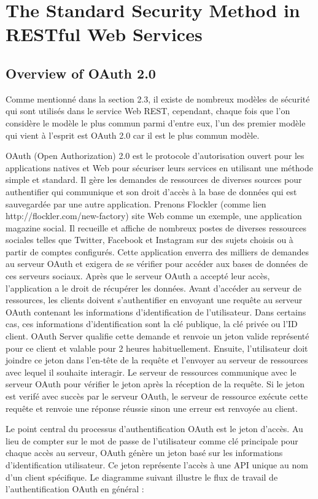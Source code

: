 \chapter{ The Standard Security Method in RESTful Web Services}
\section{Overview of OAuth 2.0}
Comme mentionné dans la section 2.3, il existe de nombreux modèles de sécurité qui sont utilisés dans le service Web REST, cependant, chaque fois que l'on considère le modèle le plus commun parmi d'entre eux, l'un des premier modèle qui vient à l'esprit est OAuth 2.0 car il est le plus commun modèle.

OAuth (Open Authorization) 2.0 est le protocole d'autorisation ouvert pour les applications natives et Web pour sécuriser leurs services en utilisant une méthode simple et standard. Il gère les demandes de ressources de diverses sources pour authentifier qui communique et son droit d'accès à la base de données qui est sauvegardée par une autre application. Prenons Flockler (comme lien http://flockler.com/new-factory) site Web comme un exemple, une application magazine social. Il recueille et affiche de nombreux postes de diverses ressources sociales telles que Twitter, Facebook et Instagram sur des sujets choisis ou à partir de comptes configurés. Cette application enverra des milliers de demandes au serveur OAuth et exigera de se vérifier pour accéder aux bases de données de ces serveurs sociaux. Après que le serveur OAuth a accepté leur accès, l'application a le droit de récupérer les données.
Avant d'accéder au serveur de ressources, les clients doivent s'authentifier  en envoyant une requête au serveur OAuth contenant les informations d'identification de l'utilisateur. Dans certains cas, ces informations d'identification sont la clé publique, la clé privée ou l'ID client. OAuth Server qualifie cette demande et renvoie un jeton valide représenté pour ce client et valable pour 2 heures habituellement. Ensuite, l'utilisateur doit joindre ce jeton dans l'en-tête de la requête et l'envoyer au serveur de ressources avec lequel il souhaite interagir. Le serveur de ressources communique avec le serveur OAuth pour vérifier le jeton après la réception de la requête. Si le jeton est verifé avec succès par le serveur OAuth, le serveur de ressource exécute cette requête et renvoie une réponse réussie sinon une erreur est renvoyée au client.

Le point central du processus d'authentification OAuth est le jeton d'accès. Au lieu de compter sur le mot de passe de l'utilisateur comme clé principale pour chaque accès au serveur, OAuth génère un jeton basé sur les informations d'identification utilisateur. Ce jeton représente l'accès à une API unique au nom d'un client spécifique.
Le diagramme suivant illustre le flux de travail de l'authentification OAuth en général \cite{1} :

